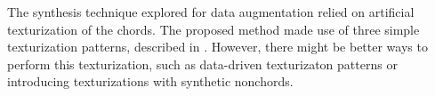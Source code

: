 
The synthesis technique explored for data augmentation
relied on artificial texturization of the chords. The
proposed method made use of three simple texturization
patterns, described in .
However, there might be better ways to perform this
texturization, such as data-driven texturizaton patterns or
introducing texturizations with synthetic \gls{nonchord}s.
